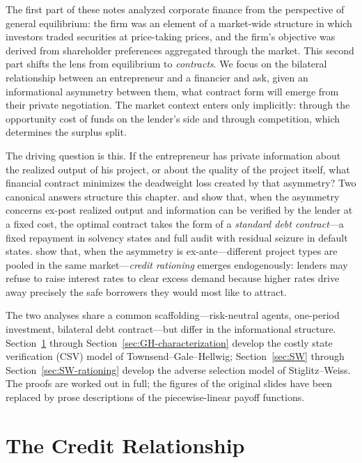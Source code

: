 \documentclass[11pt,a4paper,oneside]{book}
\theoremstyle{plain}
\theoremstyle{definition}
\theoremstyle{remark}
\numberwithin{equation}{chapter}
\begin{document}
The first part of these notes analyzed corporate finance from the perspective of general equilibrium: the firm was an element of a market-wide structure in which investors traded securities at price-taking prices, and the firm's objective was derived from shareholder preferences aggregated through the market.
This second part shifts the lens from equilibrium to \emph{contracts}.
We focus on the bilateral relationship between an entrepreneur and a financier and ask, given an informational asymmetry between them, what contract form will emerge from their private negotiation.
The market context enters only implicitly: through the opportunity cost of funds on the lender's side and through competition, which determines the surplus split.

The driving question is this.
If the entrepreneur has private information about the realized output of his project, or about the quality of the project itself, what financial contract minimizes the deadweight loss created by that asymmetry?
Two canonical answers structure this chapter.
\citet{Townsend1979} and \citet{GaleHellwig1985} show that, when the asymmetry concerns ex-post realized output and information can be verified by the lender at a fixed cost, the optimal contract takes the form of a \emph{standard debt contract}---a fixed repayment in solvency states and full audit with residual seizure in default states.
\citet{StiglitzWeiss1981} show that, when the asymmetry is ex-ante---different project types are pooled in the same market---\emph{credit rationing} emerges endogenously: lenders may refuse to raise interest rates to clear excess demand because higher rates drive away precisely the safe borrowers they would most like to attract.

The two analyses share a common scaffolding---risk-neutral agents, one-period investment, bilateral debt contract---but differ in the informational structure.
Section~\ref{sec:GH-setup} through Section~\ref{sec:GH-characterization} develop the costly state verification (CSV) model of Townsend--Gale--Hellwig; Section~\ref{sec:SW} through Section~\ref{sec:SW-rationing} develop the adverse selection model of Stiglitz--Weiss.
The proofs are worked out in full; the figures of the original slides have been replaced by prose descriptions of the piecewise-linear payoff functions.

\section{The Credit Relationship}
\label{sec:GH-setup}
\end{document}
